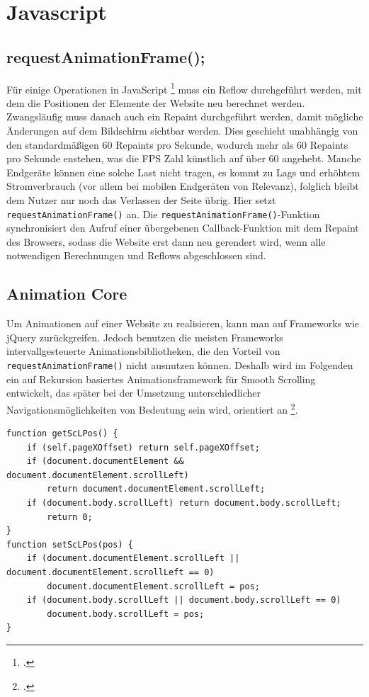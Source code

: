 \section{Javascript}

	\subsection{requestAnimationFrame();}

Für einige Operationen in JavaScript \footcite[vgl.][]{reflow} muss ein Reflow durchgeführt werden, mit dem die Positionen der Elemente der Website neu berechnet werden. Zwangsläufig muss danach auch ein Repaint durchgeführt werden, damit mögliche Änderungen auf dem Bildschirm sichtbar werden. Dies geschieht unabhängig von den standardmäßigen 60 Repaints pro Sekunde, wodurch mehr als 60 Repaints pro Sekunde enstehen, was die FPS Zahl künstlich auf über 60 angehebt. Manche Endgeräte können eine solche Last nicht tragen, es kommt zu Lags und erhöhtem Stromverbrauch (vor allem bei mobilen Endgeräten von Relevanz), folglich bleibt dem Nutzer nur noch das Verlassen der Seite übrig. Hier setzt \lstinline{requestAnimationFrame()} an.
Die \lstinline{requestAnimationFrame()}-Funktion synchronisiert den Aufruf einer übergebenen Callback-Funktion mit dem Repaint des Browsers, sodass die Website erst dann neu gerendert wird, wenn alle notwendigen Berechnungen und Reflows abgeschlossen sind.


\subsection{Animation Core}
Um Animationen auf einer Website zu realisieren, kann man auf Frameworks wie jQuery zurückgreifen. Jedoch benutzen die meisten Frameworks intervallgesteuerte Animationsbibliotheken, die den Vorteil von \lstinline{requestAnimationFrame()} nicht ausnutzen können. Deshalb wird im Folgenden ein auf Rekursion basiertes Animationsframework für Smooth Scrolling entwickelt, das später bei der Umsetzung unterschiedlicher Navigationsmöglichkeiten von Bedeutung sein wird, orientiert an \footcite[vgl.][]{rAF}.

\begin{lstlisting}[caption=Die Funktionen setScLPos und getScLPos., label=js_get_set]
function getScLPos() {
	if (self.pageXOffset) return self.pageXOffset;
	if (document.documentElement && document.documentElement.scrollLeft)
		return document.documentElement.scrollLeft; 
	if (document.body.scrollLeft) return document.body.scrollLeft;
		return 0; 
}
function setScLPos(pos) {
	if (document.documentElement.scrollLeft || document.documentElement.scrollLeft == 0)
		document.documentElement.scrollLeft = pos;
	if (document.body.scrollLeft || document.body.scrollLeft == 0)
		document.body.scrollLeft = pos;
}
\end{lstlisting}

